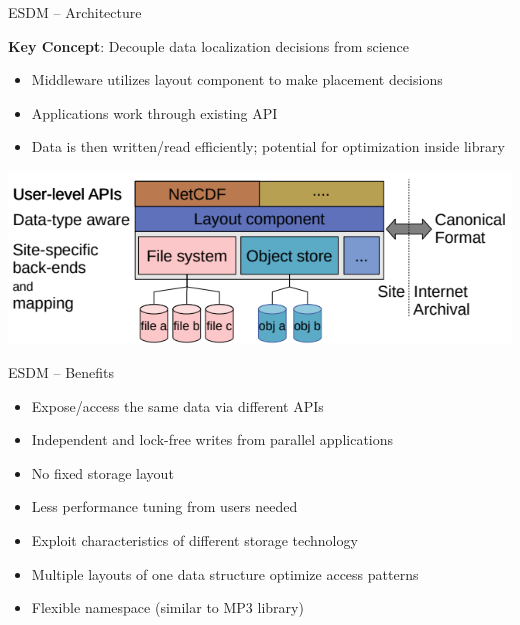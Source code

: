 \documentclass[compress,11pt,xcolor=svgnames,aspectratio=169]{beamer}
\begin{document}
\begin{frame}[fragile]{ESDM -- Architecture}

\begin{block}{\textbf{Key Concept}: Decouple data localization decisions from science}
\begin{itemize}
\setlength\itemsep{0.2cm}
  \item Middleware utilizes layout component to make placement decisions
  \item Applications work through existing API
  \item Data is then written/read efficiently; potential for optimization inside library
\end{itemize}
\end{block}

\begin{center}
\includegraphics[scale=0.6]{fig/esdm-arch}
\end{center}

\end{frame}

\begin{frame}[fragile]{ESDM -- Benefits}

\begin{itemize}
\setlength\itemsep{0.4cm}
  \item Expose/access the same data via different APIs
  \item Independent and lock-free writes from parallel applications
  \item No fixed storage layout
  \item Less performance tuning from users needed
  \item Exploit characteristics of different storage technology
  \item Multiple layouts of one data structure optimize access patterns
  \item Flexible namespace (similar to MP3 library)
\end{itemize}

\end{frame}
\end{document}
